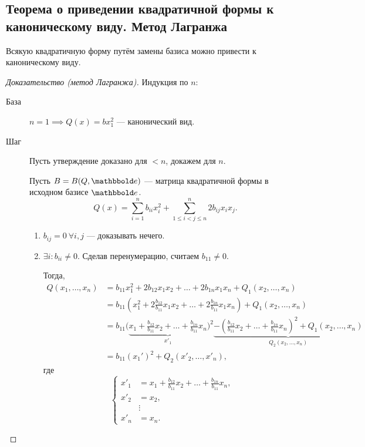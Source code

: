 \subsection{Теорема о приведении квадратичной формы к каноническому виду. Метод Лагранжа}

\begin{theorem}
    Всякую квадратичную форму путём замены базиса можно привести к каноническому виду.
\end{theorem}

\begin{proof}[Доказательство (метод Лагранжа)]
    Индукция по $n$:
    \begin{description}
    \item[База] $n = 1 \implies Q(x) = b x_1^2$ --- канонический вид.
    \item[Шаг] Пусть утверждение доказано для $< n$, докажем для $n$.

        Пусть $B = B(Q, \E)$ --- матрица квадратичной формы в исходном базисе $\E$.
        \begin{equation*}
            Q(x) = \sum_{i = 1}^{n} b_{ii} x_i^2 + \sum_{1 \leq i < j \leq n}^{n} 2 b_{ij} x_i x_j
        .\end{equation*}

        \begin{enumerate}[start=0,label=Случай \arabic*.]
        \item
            $b_{ij} = 0 \ \forall i, j$ --- доказывать нечего.
        \item
            $\exists i : b_{ii} \neq 0$. Сделав перенумерацию, считаем $b_{11} \neq 0$.

            Тогда,
            \begin{align*}
                Q(x_1, \dots, x_n)
                &= b_{11} x_1^2 + 2b_{12} x_1 x_2 + \dots + 2 b_{1n} x_1 x_n + Q_1(x_2, \dots, x_n) \\
                &= b_{11} \left(x_1^2 + 2\frac{b_{12}}{b_{11}} x_1 x_2 + \dots + 2\frac{b_{1n}}{b_{11}} x_1 x_n\right) + Q_1(x_2, \dots, x_n) \\
                &= b_{11} \Bigg(\underbrace{x_1 + \frac{b_{12}}{b_{11}} x_2 + \dots + \frac{b_{1n}}{b_{11}} x_n}_{x'_1}\Bigg)^2 \underbrace{ - \left(\frac{b_{12}}{b_{11}}x_2 + \dots + \frac{b_{1n}}{b_{11}} x_n\right)^2 + Q_1(x_2, \dots, x_n)}_{Q_2(x_2, \dots, x_n)} \\
                &= b_{11} (x_1')^2 + Q_2 (x'_2, \dots, x'_n)
            ,\end{align*}
            где
            \begin{equation*}
                \begin{cases}
                    x'_1 &= x_1 + \frac{b_{12}}{b_{11}} x_2 + \dots + \frac{b_{1n}}{b_{11}} x_n, \\
                    x'_2 &= x_2, \\
                         &\vdots \\
                    x'_n &= x_n.
                \end{cases}
            \end{equation*}


\end{enumerate}
\end{description}
\end{proof}
